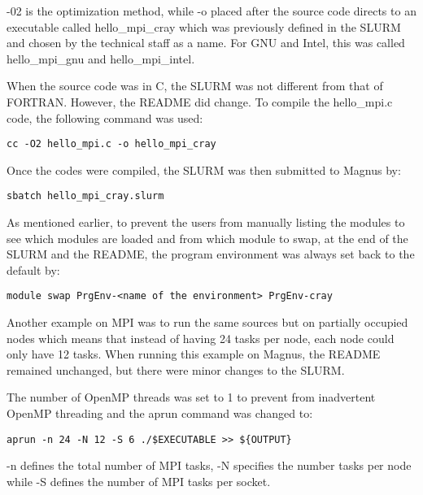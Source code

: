 -02 is the optimization method, while -o placed after the source code directs to an executable called hello\_mpi\_cray which was previously defined in
the SLURM and chosen by the technical staff as a name. For GNU and Intel, this was called hello\_mpi\_gnu and hello\_mpi\_intel. 

When the source code was in C, the SLURM was not different from that of FORTRAN. However, the README did change. To compile the hello\_mpi.c code, the 
following command was used: 

\begin{tcolorbox}
\begin{Verbatim}[fontsize=\scriptsize]
cc -O2 hello_mpi.c -o hello_mpi_cray
\end{Verbatim}
\end{tcolorbox}

Once the codes were compiled, the SLURM was then submitted to Magnus by:

\begin{tcolorbox}
\begin{Verbatim}[fontsize=\scriptsize]
sbatch hello_mpi_cray.slurm 
\end{Verbatim}
\end{tcolorbox}

As mentioned earlier, to prevent the users from manually listing the modules to see which modules are loaded and from which module to swap, at the end
of the SLURM and the README, the program environment was always set back to the default by:

\begin{tcolorbox}
\begin{Verbatim}[fontsize=\scriptsize]
module swap PrgEnv-<name of the environment> PrgEnv-cray
\end{Verbatim}
\end{tcolorbox}

Another example on MPI was to run the same sources but on partially occupied nodes which means that instead of having 24 tasks per node, each node could
only have 12 tasks. When running this example on Magnus, the README remained unchanged, but there were minor changes to the SLURM.

The number of OpenMP threads was set to 1 to prevent from inadvertent OpenMP threading and the aprun command was changed to:

\begin{tcolorbox}
\begin{Verbatim}[fontsize=\scriptsize]
aprun -n 24 -N 12 -S 6 ./$EXECUTABLE >> ${OUTPUT}
\end{Verbatim}
\end{tcolorbox}

-n defines the total number of MPI tasks, -N specifies the number tasks per node while -S defines the number of MPI tasks per socket.

